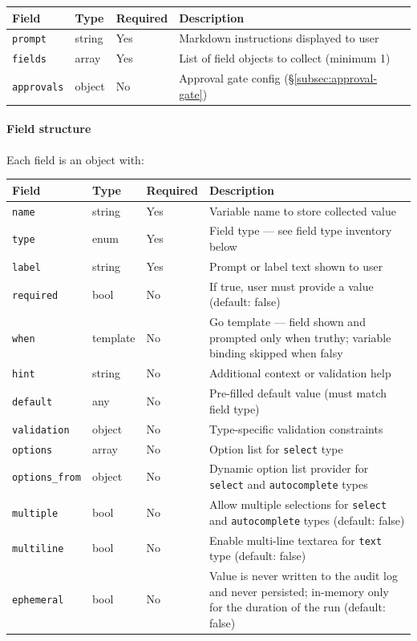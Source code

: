 \begin{center}
\begin{tabular}{lllp{5cm}}
\hline
\textbf{Field} & \textbf{Type} & \textbf{Required} & \textbf{Description} \\
\hline
\texttt{prompt}     & string  & Yes & Markdown instructions displayed to user \\
\texttt{fields}     & array   & Yes & List of field objects to collect (minimum 1) \\
\texttt{approvals}  & object  & No  & Approval gate config (\S\ref{subsec:approval-gate}) \\
\hline
\end{tabular}
\end{center}

\paragraph{Field structure}

Each field is an object with:

\begin{center}
\begin{tabular}{lllp{4cm}}
\hline
\textbf{Field} & \textbf{Type} & \textbf{Required} & \textbf{Description} \\
\hline
\texttt{name}       & string  & Yes & Variable name to store collected value \\
\texttt{type}       & enum    & Yes & Field type — see field type inventory below \\
\texttt{label}      & string  & Yes & Prompt or label text shown to user \\
\texttt{required}   & bool    & No  & If true, user must provide a value (default: false) \\
\texttt{when}       & template & No  & Go template — field shown and prompted only when truthy; variable binding skipped when falsy \\
\texttt{hint}       & string  & No  & Additional context or validation help \\
\texttt{default}    & any     & No  & Pre-filled default value (must match field type) \\
\texttt{validation} & object  & No  & Type-specific validation constraints \\
\texttt{options}    & array   & No  & Option list for \texttt{select} type \\
\texttt{options\_from} & object & No & Dynamic option list provider for \texttt{select} and \texttt{autocomplete} types \\
\texttt{multiple}   & bool    & No  & Allow multiple selections for \texttt{select} and \texttt{autocomplete} types (default: false) \\
\texttt{multiline}  & bool    & No  & Enable multi-line textarea for \texttt{text} type (default: false) \\
\texttt{ephemeral}  & bool    & No  & Value is never written to the audit log and never persisted; in-memory only for the duration of the run (default: false) \\
\hline
\end{tabular}
\end{center}

